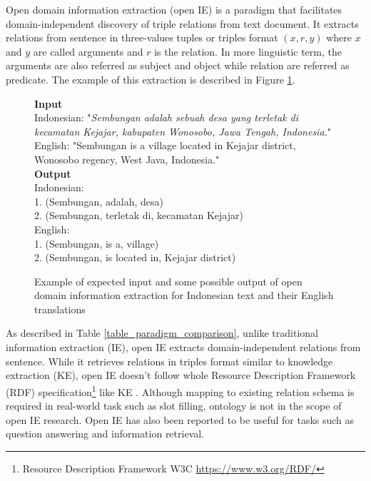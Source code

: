\documentclass[conference,compsoc,12pt]{IEEEtran}
\begin{document}
Open domain information extraction (open IE) is a paradigm that facilitates domain-independent discovery of triple relations from text document\cite{banko2007open}. It extracts relations from sentence in three-values tuples or triples format $(x, r, y)$ where $x$ and $y$ are called arguments and $r$ is the relation\cite{etzioni2011open}. In more linguistic term, the arguments are also referred as subject and object while relation are referred as predicate\cite{angeli2015leveraging}. The example of this extraction is described in Figure \ref{fig_example_io_openie}.

\begin{figure}
\begin{mdframed}
\textbf{Input} \\[0.1cm]
Indonesian: "\textit{Sembungan adalah sebuah desa yang terletak di kecamatan Kejajar, kabupaten Wonosobo, Jawa Tengah, Indonesia.}" \\

English: "Sembungan is a village located in Kejajar district, Wonosobo regency, West Java, Indonesia." \\[0.5cm]

\textbf{Output} \\[0.1cm]
Indonesian: \\
1. (Sembungan, adalah, desa) \\
2. (Sembungan, terletak di, kecamatan Kejajar) \\

English: \\
1. (Sembungan, is a, village) \\
2. (Sembungan, is located in, Kejajar district)

\end{mdframed}
\caption{Example of expected input and some possible output of open domain information extraction for Indonesian text and their English translations}
\label{fig_example_io_openie}
\end{figure}

As described in Table \ref{table_paradigm_comparison}, unlike traditional information extraction (IE), open IE extracts domain-independent relations from sentence. While it retrieves relations in triples format similar to knowledge extraction (KE), open IE doesn't follow whole Resource Description Framework (RDF) specification\footnote{Resource Description Framework W3C \url{https://www.w3.org/RDF/}} like KE\cite{auer2007dbpedia} \cite{exner2014refractive}. Although mapping to existing relation schema is required in real-world task such as slot filling\cite{angeli2015leveraging}, ontology is not in the scope of open IE research. Open IE has also been reported to be useful for tasks such as question answering\cite{fader2011identifying} and information retrieval\cite{etzioni2011search}. 
\end{document}
